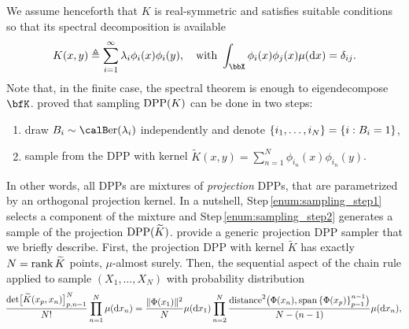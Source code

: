 \documentclass[twoside,11pt]{article}
\begin{document}
        We assume henceforth that $K$ is real-symmetric and satisfies suitable conditions \citep[][Theorem\,3]{Sos00} so that its spectral decomposition is available
        \begin{equation*}
        \setlength{\belowdisplayskip}{0pt}
        \setlength{\belowdisplayshortskip}{0pt}
        \setlength{\abovedisplayskip}{0pt}
        \setlength{\abovedisplayshortskip}{0pt}
        \label{eq:eigdec_kernel}
        K(x,y)
        \triangleq
          \suml_{i=1}^{\infty}
            \lambda_i \phi_i(x) \phi_i(y),
          \quad \text{with }
            \int_{\bbX} \phi_i(x) \phi_j(x) \mu(\diff x) = \delta_{ij}.
        \end{equation*}
        Note that, in the finite case, the spectral theorem is enough to eigendecompose $\bfK$.
         proved that sampling $\operatorname{DPP}(K)$ can be done in two steps:
        \begin{enumerate}
            \item draw $B_i\sim\Ber(\lambda_i)$ independently and denote $\left\{ i_1,\dots,i_{N} \right\} = \left\{ i:B_i=1 \right\}$,\label{enum:sampling_step1}
            \item sample from the DPP with kernel $\tilde{K}(x,y) = \sum_{n=1}^{N}\phi_{i_n}(x) \phi_{i_n}(y)$.\label{enum:sampling_step2}
        \end{enumerate}
        In other words, all DPPs are mixtures of \emph{projection} DPPs, that are parametrized by an orthogonal projection kernel.
        In a nutshell, Step\,\ref{enum:sampling_step1} selects a component of the mixture and Step\,\ref{enum:sampling_step2} generates a sample of the projection $\operatorname{DPP}(\widetilde{K})$.
         provide a generic projection DPP sampler that we briefly describe.
        First, the projection DPP with kernel $\tilde{K}$ has exactly $N=\operatorname{rank} \widetilde{K}$ points, $\mu$-almost surely.
        Then, the sequential aspect of the chain rule applied to sample $(X_1,\dots,X_N)$ with probability distribution
        \begin{equation}
        \label{eq:joint_distribution}
        \!
        \small
        \frac{\det\!\big[\widetilde K(x_p,x_n)\big]_{p,n=1}^N}{N!}
            \prod_{n=1}^N \mu(\mathop{}\!\mathrm{d} x_n)
        =
                \frac{\|\Phi(x_1)\|^2}{N}
            \mu(\mathop{}\!\mathrm{d} x_1)
            \prod_{n=2}^{N}
                \frac{\operatorname{distance}^2\!\big(\Phi(x_n), \operatorname{span}\left\{ \Phi(x_p) \right\}_{p=1}^{n-1}\!\big)}{N-(n-1)}
                \mu(\mathop{}\!\mathrm{d} x_n),
        \end{equation}
\end{document}
